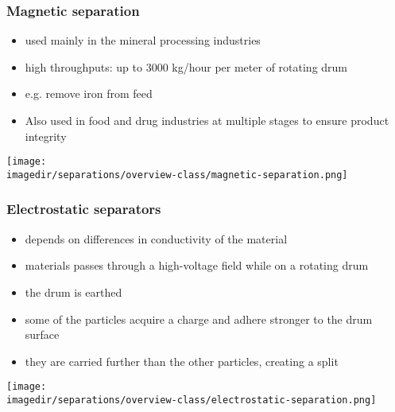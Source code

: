 \begin{frame}\frametitle{{\color{myGreen}{Quick mention:}} Magnetic separation}
	\begin{itemize}
		\item	used mainly in the mineral processing industries
		\item	high throughputs: up to 3000 kg/hour per meter of rotating drum
		\item	e.g. remove iron from feed
		\item	Also used in food and drug industries at multiple stages to ensure product integrity		
	\end{itemize}
	
	\begin{center}
		\texttt{[image: \\imagedir/separations/overview-class/magnetic-separation.png]}
	\end{center}
\end{frame}

\begin{frame}\frametitle{{\color{myGreen}{Quick mention:}} Electrostatic separators}
	
	\begin{itemize}
		\item	depends on differences in conductivity of the material
		\item	materials passes through a high-voltage field while on a rotating drum
		\item	the drum is earthed
		\item	some of the particles acquire a charge and adhere stronger to the drum surface
		\item	they are carried further than the other particles, creating a split
	\end{itemize}
	
	\begin{center}
		\texttt{[image: \\imagedir/separations/overview-class/electrostatic-separation.png]}
	\end{center}
\end{frame}